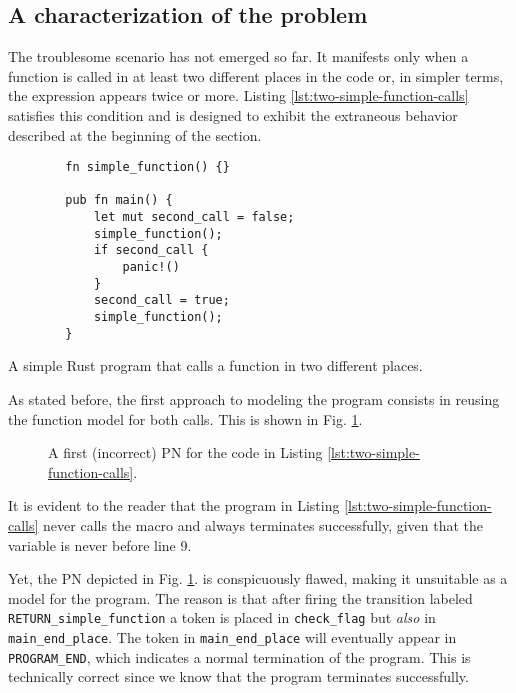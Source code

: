 \subsection{A characterization of the problem}

The troublesome scenario has not emerged so far.
It manifests only when a function is called
in at least two different places in the code or,
in simpler terms, the expression  appears twice or more.
Listing \ref{lst:two-simple-function-calls} satisfies this condition
and is designed to exhibit
the extraneous behavior described at the beginning of the section.

\begin{listing}[!htb]
    \begin{verbatim}
        fn simple_function() {}

        pub fn main() {
            let mut second_call = false;
            simple_function();
            if second_call {
                panic!()
            }
            second_call = true;
            simple_function();
        }
    \end{verbatim}
    \caption{A simple Rust program that calls a function in two different places.}
    \label{lst:two-simple-function-calls}
\end{listing}

As stated before, the first approach to modeling the program consists
in reusing the function model for both calls.
This is shown in Fig. \ref{fig:two-function-calls-incorrect-1}.

\begin{figure}[!htbp]
    \centering
    
    \caption{A first (incorrect) \acrshort{PN} for the code
        in Listing \ref{lst:two-simple-function-calls}.}
    \label{fig:two-function-calls-incorrect-1}
\end{figure}

It is evident to the reader that
the program in Listing \ref{lst:two-simple-function-calls}
never calls the  macro and always terminates successfully,
given that the variable 
is never  before line 9.

Yet, the \acrshort{PN} depicted in Fig. \ref{fig:two-function-calls-incorrect-1}.
is conspicuously flawed, making it unsuitable as a model for the program.
The reason is that after firing the transition labeled \texttt{RETURN\_simple\_function}
a token is placed in \texttt{check\_flag} but \emph{also} in \texttt{main\_end\_place}.
The token in \texttt{main\_end\_place} will eventually appear in \texttt{PROGRAM\_END},
which indicates a normal termination of the program.
This is technically correct since we know that the program terminates successfully.

